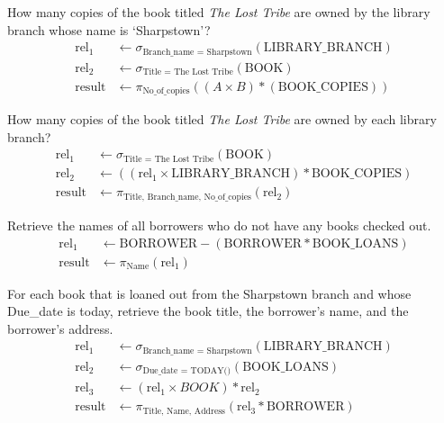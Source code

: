 \documentclass{article}
\begin{document}
\begin{parlist}
    \item How many copies of the book titled \textit{The Lost Tribe} are owned by the library branch whose name is `Sharpstown'?
    \begin{align*}
        \text{rel}_1 &\leftarrow \sigma_{\text{Branch\_name = Sharpstown}}(\text{LIBRARY\_BRANCH}) \\
        \text{rel}_2 &\leftarrow \sigma_{\text{Title = The Lost Tribe}}(\text{BOOK}) \\
        \text{result} &\leftarrow \pi_{\text{No\_of\_copies}}((A \times B) * (\text{BOOK\_COPIES})) 
    \end{align*}
    
    \item How many copies of the book titled \textit{The Lost Tribe} are owned by each library branch?
    \begin{align*}
        \text{rel}_1 &\leftarrow \sigma_{\text{Title = The Lost Tribe}}(\text{BOOK}) \\
        \text{rel}_2 &\leftarrow ((\text{rel}_1 \times \text{LIBRARY\_BRANCH}) * \text{BOOK\_COPIES}) \\
        \text{result} &\leftarrow \pi_{\text{Title, Branch\_name, No\_of\_copies}}(\text{rel}_2)
    \end{align*}
    
    \item Retrieve the names of all borrowers who do not have any books checked out.
    \begin{align*}
        \text{rel}_1 &\leftarrow \text{BORROWER} - (\text{BORROWER} * \text{BOOK\_LOANS}) \\
        \text{result} &\leftarrow \pi_{\text{Name}}(\text{rel}_1)
    \end{align*}
    
    \item For each book that is loaned out from the Sharpstown branch and whose Due\_date is today, retrieve the book title, the borrower's name, and the borrower's address.
    \begin{align*}
        \text{rel}_1 &\leftarrow \sigma_{\text{Branch\_name = Sharpstown}}(\text{LIBRARY\_BRANCH}) \\
        \text{rel}_2 &\leftarrow \sigma_{\text{Due\_date = TODAY()}}(\text{BOOK\_LOANS}) \\
        \text{rel}_3 &\leftarrow (\text{rel}_1 \times BOOK) * \text{rel}_2 \\
        \text{result} &\leftarrow \pi_{\text{Title, Name, Address}}(\text{rel}_3 * \text{BORROWER})
    \end{align*}
    

\end{parlist}
\end{document}
